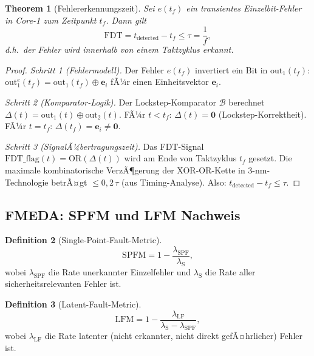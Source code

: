 ﻿\documentclass[a4paper,12pt]{article}
\theoremstyle{plain}
\newtheorem{theorem}{Theorem}[section]
\theoremstyle{definition}
\newtheorem{definition}[theorem]{Definition}
\theoremstyle{remark}
\begin{document}
\begin{theorem}[Fehlererkennungszeit]\label{thm:fdt}
Sei $e(t_f)$ ein transientes Einzelbit-Fehler in Core-1 zum
Zeitpunkt $t_f$. Dann gilt
\[
  \mathrm{FDT} = t_\mathrm{detected} - t_f \leq \tau = \frac{1}{f},
\]
d.h.\ der Fehler wird innerhalb von einem Taktzyklus erkannt.
\end{theorem}
\begin{proof}
\textit{Schritt 1 (Fehlermodell).}
Der Fehler $e(t_f)$ invertiert ein Bit in $\text{out}_1(t_f)$:
$\text{out}_1^e(t_f) = \text{out}_1(t_f) \oplus \mathbf{e}_i$
fÃ¼r einen Einheitsvektor $\mathbf{e}_i$.

\textit{Schritt 2 (Komparator-Logik).}
Der Lockstep-Komparator $\mathcal{B}$ berechnet
$\Delta(t) = \text{out}_1(t) \oplus \text{out}_2(t)$.
FÃ¼r $t < t_f$: $\Delta(t) = \mathbf{0}$ (Lockstep-Korrektheit).
FÃ¼r $t = t_f$: $\Delta(t_f) = \mathbf{e}_i \neq \mathbf{0}$.

\textit{Schritt 3 (SignalÃ¼bertragungszeit).}
Das FDT-Signal $\mathrm{FDT\_flag}(t) = \mathrm{OR}(\Delta(t))$
wird am Ende von Taktzyklus $t_f$ gesetzt.
Die maximale kombinatorische VerzÃ¶gerung der XOR-OR-Kette
in 3-nm-Technologie betrÃ¤gt $\leq 0{,}2\,\tau$ (aus Timing-Analyse).
Also: $t_\mathrm{detected} - t_f \leq \tau$.
\end{proof}

\subsection{FMEDA: SPFM und LFM Nachweis}\label{ssec:fmeda}

\begin{definition}[Single-Point-Fault-Metric]\label{def:spfm}
\[
  \mathrm{SPFM} = 1 - \frac{\lambda_\mathrm{SPF}}{\lambda_\mathrm{S}},
\]
wobei $\lambda_\mathrm{SPF}$ die Rate unerkannter Einzelfehler und
$\lambda_\mathrm{S}$ die Rate aller sicherheitsrelevanten Fehler ist.
\end{definition}

\begin{definition}[Latent-Fault-Metric]\label{def:lfm}
\[
  \mathrm{LFM} = 1 - \frac{\lambda_\mathrm{LF}}{\lambda_\mathrm{S} - \lambda_\mathrm{SPF}},
\]
wobei $\lambda_\mathrm{LF}$ die Rate latenter (nicht erkannter, nicht
direkt gefÃ¤hrlicher) Fehler ist.
\end{definition}
\end{document}
